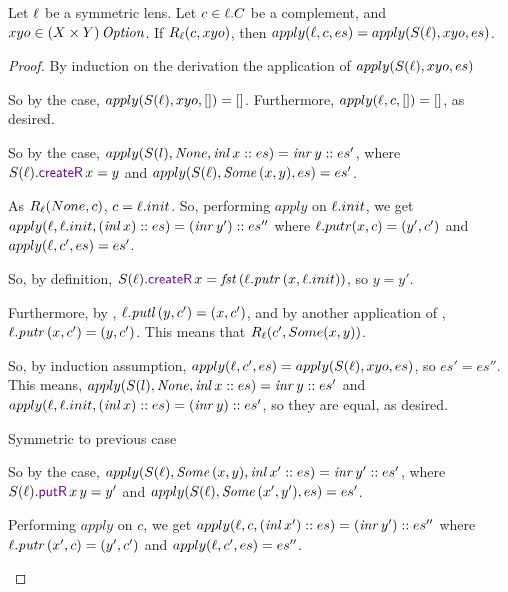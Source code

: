 \documentclass[acmsmall,screen,anonymous]{acmart}
\begin{document}
\begin{mylemma}
  \label{lem:s-equiv}
  Let $\mathit{\ell}$ be a symmetric lens.  Let $c \in \mathit{\ell}.C$ be a complement, and
  $xyo \in (X \times Y) \, \mathit{Option}$.  If $R_{\mathit{\ell}}(c,xyo)$, then
  $apply(\mathit{\ell},c,es) = apply(S(\mathit{\ell}),xyo,es)$.
\end{mylemma}
\begin{proof}
  By induction on the derivation the application of $apply(S(\mathit{\ell}),xyo,es)$
  \begin{case}
    So by the case, $apply(S(\mathit{\ell}),xyo,[]) = []$. Furthermore,
    $apply(\mathit{\ell},c,[]) = []$, as desired.
  \end{case}
  \begin{case}
    So by the case, $apply(S(l),\mathit{None},\mathit{inl} \, x::es) = \mathit{inr} \, y::es'$, where
    $S(\Lens).\CreateROf{x} = y$ and $apply(S(\mathit{\ell}),\mathit{Some}\,(x,y),es) = es'$.

    As $R_{\mathit{\ell}}(None,c)$, $c = \mathit{\ell}.init$. So, performing $apply$ on
    $\mathit{\ell}.init$, we get $apply(\mathit{\ell},\mathit{\ell}.init,(\mathit{inl} \, x)::es) =
    (\mathit{inr} \, y')::es''$ where $\mathit{\ell}.putr(x,c) = (y',c')$ and $apply(\mathit{\ell},c',es)
    = es'$.

    So, by definition, $S(\Lens).\CreateROf{x} = \Fst \App (\Lens.\PutRSymOf{(x,\Lens.init)})$, so $y = y'$.

    Furthermore, by \PutRL, $\mathit{\ell}.\mathit{putl} \, (y,c') = (x,c')$, and by another
    application of \PutLR, $\mathit{\ell}.\mathit{putr} \, (x,c') = (y,c')$.  This means
    that $R_{\mathit{\ell}}(c',Some (x,y))$.

    So, by induction assumption, $apply(\mathit{\ell},c',es) = apply(S(\mathit{\ell}),xyo,es)$, so
    $es' = es''$.  This means, $apply(S(l),\mathit{None},\mathit{inl} \, x::es) =
    \mathit{inr} \, y::es'$ and $apply(\mathit{\ell},\mathit{\ell}.init,(\mathit{inl} \, x)::es) =
    (\mathit{inr} \, y)::es'$, so they are equal, as desired.
  \end{case}
  \begin{case}
    Symmetric to previous case
  \end{case}
  \begin{case}
    So by the case, $apply(S(\mathit{\ell}),\mathit{Some}\,(x,y),\mathit{inl} \, x'::es) = \mathit{inr} \, y'::es'$, where
    $S(\Lens).\PutROf{x}{y} = y'$ and $apply(S(\mathit{\ell}),\mathit{Some}\,(x',y'),es) = es'$.

    Performing $apply$ on $c$, we get $apply(\mathit{\ell},c,(\mathit{inl} \, x')::es) =
    (\mathit{inr} \, y')::es''$ where $\mathit{\ell}.\mathit{putr} \, (x',c) = (y',c')$ and
    $apply(\mathit{\ell},c',es) = es''$.


\end{case}
\end{proof}
\end{document}
